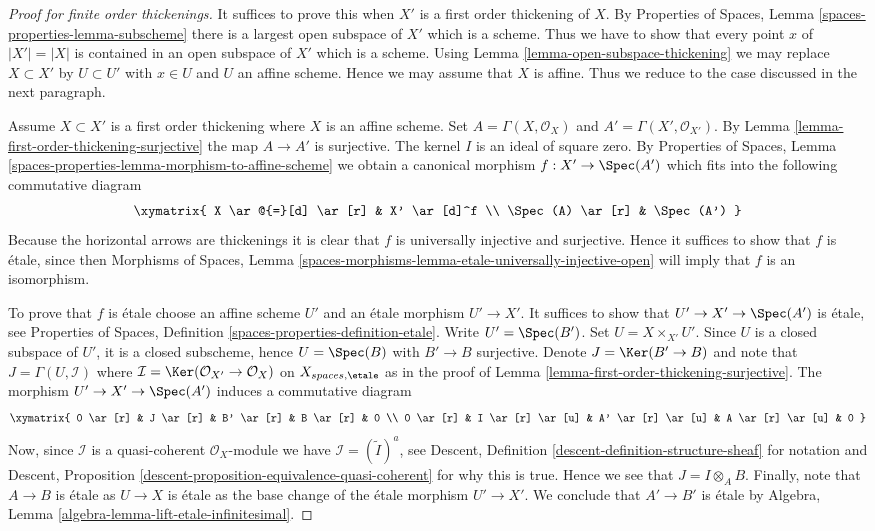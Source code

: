 \begin{proof}[Proof for finite order thickenings]
It suffices to prove this when $X'$ is a first order thickening of $X$. By
Properties of Spaces, Lemma \ref{spaces-properties-lemma-subscheme}
there is a largest open subspace of $X'$ which is a scheme. Thus we have
to show that every point $x$ of $|X'| = |X|$ is contained in an open subspace of
$X'$ which is a scheme. Using
Lemma \ref{lemma-open-subspace-thickening}
we may replace $X \subset X'$ by $U \subset U'$ with $x \in U$ and $U$
an affine scheme. Hence we may assume that $X$ is affine.
Thus we reduce to the case discussed in the next paragraph.

\medskip\noindent
Assume $X \subset X'$ is a first order thickening where $X$ is an affine
scheme. Set $A = \Gamma(X, \mathcal{O}_X)$ and
$A' = \Gamma(X', \mathcal{O}_{X'})$. By
Lemma \ref{lemma-first-order-thickening-surjective}
the map $A \to A'$ is surjective. The kernel $I$ is an ideal of square zero. By
Properties of Spaces,
Lemma \ref{spaces-properties-lemma-morphism-to-affine-scheme}
we obtain a canonical morphism $f : X' \to \Spec(A')$ which fits
into the following commutative diagram
$$
\xymatrix{
X \ar@{=}[d] \ar[r] &  X' \ar[d]^f \\
\Spec(A) \ar[r] & \Spec(A')
}
$$
Because the horizontal arrows are thickenings it is clear that $f$ is
universally injective and surjective. Hence it suffices to show that
$f$ is \'etale, since then
Morphisms of Spaces,
Lemma \ref{spaces-morphisms-lemma-etale-universally-injective-open}
will imply that $f$ is an isomorphism.

\medskip\noindent
To prove that $f$ is \'etale choose an affine scheme $U'$ and an
\'etale morphism $U' \to X'$. It suffices to show that
$U' \to X' \to \Spec(A')$ is \'etale, see
Properties of Spaces, Definition \ref{spaces-properties-definition-etale}.
Write $U' = \Spec(B')$. Set $U = X \times_{X'} U'$. Since $U$
is a closed subspace of $U'$, it is a closed subscheme, hence
$U = \Spec(B)$ with $B' \to B$ surjective. Denote
$J = \Ker(B' \to B)$ and note that $J = \Gamma(U, \mathcal{I})$
where $\mathcal{I} = \Ker(\mathcal{O}_{X'} \to \mathcal{O}_X)$
on $X_{spaces, \etale}$ as in the proof of
Lemma \ref{lemma-first-order-thickening-surjective}.
The morphism $U' \to X' \to \Spec(A')$ induces a commutative
diagram
$$
\xymatrix{
0 \ar[r] &
J \ar[r] &
B' \ar[r] &
B \ar[r] & 0 \\
0 \ar[r] &
I \ar[r] \ar[u] &
A' \ar[r] \ar[u] &
A \ar[r] \ar[u] & 0
}
$$
Now, since $\mathcal{I}$ is a quasi-coherent $\mathcal{O}_X$-module
we have $\mathcal{I} = (\widetilde I)^a$, see
Descent, Definition \ref{descent-definition-structure-sheaf}
for notation and
Descent, Proposition \ref{descent-proposition-equivalence-quasi-coherent}
for why this is true. Hence we see that $J = I \otimes_A B$.
Finally, note that $A \to B$ is \'etale as $U \to X$ is \'etale as
the base change of the \'etale morphism $U' \to X'$.
We conclude that $A' \to B'$ is \'etale by
Algebra, Lemma \ref{algebra-lemma-lift-etale-infinitesimal}.
\end{proof}

